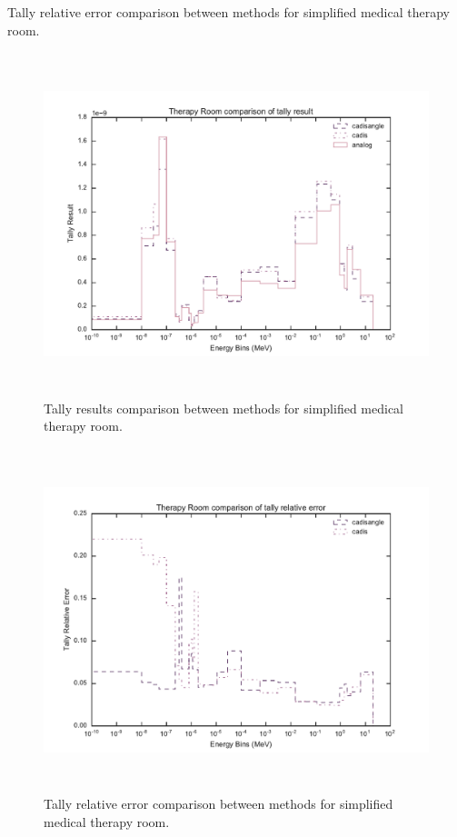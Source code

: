 \begin{table}[h!]
  \centering
  
  \caption[Tally results comparison between methods for simplified medical
  therapy room.]{Tally relative error comparison between methods for simplified
  medical therapy room.}
  \label{tab:therapyfoms}
\end{table}

\begin{figure}[h!]
  \centering
  \includegraphics[height=10cm]{./chapters/characterization_probs/figures/char/therapy/therapy_room_tally_result_compare.pdf}
  \caption[Tally results comparison between methods for simplified medical
  therapy room.]
  {Tally results comparison between methods for simplified medical therapy room.}
  \label{fig:therapyresult}
\end{figure}

\begin{figure}[h!]
  \centering
  \includegraphics[height=10cm]{./chapters/characterization_probs/figures/char/therapy/therapy_room_tally_error_compare.pdf}
  \caption[Tally relative error comparison between methods for simplified
  medical therapy room.]
  {Tally relative error comparison between methods for simplified medical
  therapy room.}
  \label{fig:therapyerror}
\end{figure}

